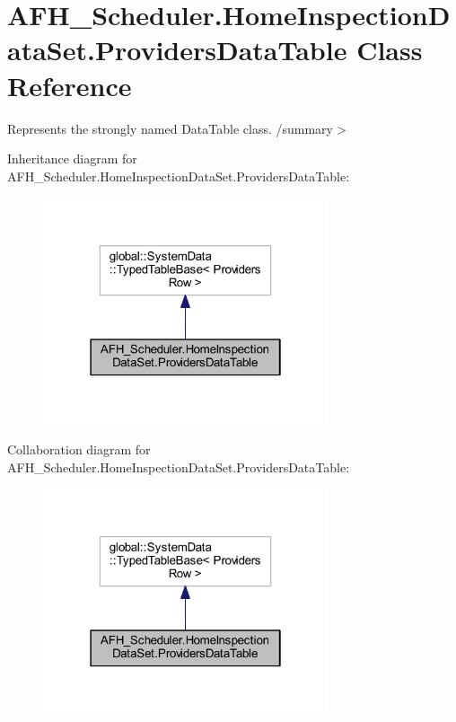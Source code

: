 \section{A\+F\+H\+\_\+\+Scheduler.\+Home\+Inspection\+Data\+Set.\+Providers\+Data\+Table Class Reference}
\label{class_a_f_h___scheduler_1_1_home_inspection_data_set_1_1_providers_data_table}


Represents the strongly named Data\+Table class. /summary$>$  




Inheritance diagram for A\+F\+H\+\_\+\+Scheduler.\+Home\+Inspection\+Data\+Set.\+Providers\+Data\+Table\+:
\nopagebreak
\begin{figure}[H]
\begin{center}
\leavevmode
\includegraphics[width=238pt]{class_a_f_h___scheduler_1_1_home_inspection_data_set_1_1_providers_data_table__inherit__graph}
\end{center}
\end{figure}


Collaboration diagram for A\+F\+H\+\_\+\+Scheduler.\+Home\+Inspection\+Data\+Set.\+Providers\+Data\+Table\+:
\nopagebreak
\begin{figure}[H]
\begin{center}
\leavevmode
\includegraphics[width=238pt]{class_a_f_h___scheduler_1_1_home_inspection_data_set_1_1_providers_data_table__coll__graph}
\end{center}
\end{figure}
